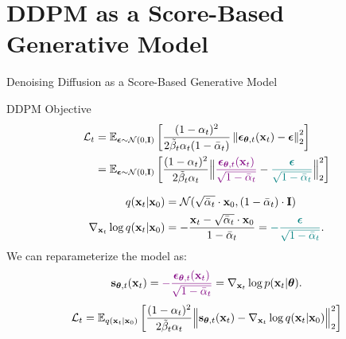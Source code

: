 \documentclass{beamer}
\begin{document}
\section{DDPM as a Score-Based Generative Model}
\begin{frame}{Denoising Diffusion as a Score-Based Generative Model}
	\begin{block}{DDPM Objective}
		\vspace{-0.7cm}
		\begin{align*}
			\mathcal{L}_t &= \mathbb{E}_{\boldsymbol{\epsilon} \sim \mathcal{N}(0, \mathbf{I})} \left[ \frac{(1 - \alpha_t)^2}{2\tilde{\beta}_t \alpha_t  (1 - \bar{\alpha}_t)}  \left\|  \boldsymbol{\epsilon}_{\boldsymbol{\theta}, t} (\mathbf{x}_t) - \boldsymbol{\epsilon}\right\|_2^2  \right] \\
			& = \mathbb{E}_{\boldsymbol{\epsilon} \sim \mathcal{N}(0, \mathbf{I})} \left[ \frac{(1 - \alpha_t)^2}{2\tilde{\beta}_t \alpha_t }  \Bigl\| {\color{violet} \frac{\boldsymbol{\epsilon}_{\boldsymbol{\theta}, t}  (\mathbf{x}_t) }{\sqrt{1 - \bar{\alpha}_t}}} - {\color{teal}\frac{\boldsymbol{\epsilon}}{\sqrt{1 - \bar{\alpha}_t}}}\Bigr\|_2^2  \right]
		\end{align*}
		\vspace{-0.7cm}
	\end{block}
	\vspace{-0.5cm}
	\begin{align*}
		q(\mathbf{x}_t | \mathbf{x}_0) &= \mathcal{N}(\sqrt{\bar{\alpha}_t} \cdot \mathbf{x}_0, (1 - \bar{\alpha}_t) \cdot \mathbf{I}) \\
		\nabla_{\mathbf{x}_t} \log q(\mathbf{x}_t | \mathbf{x}_0) &= - \frac{\mathbf{x}_t - \sqrt{\bar{\alpha}_t} \cdot \mathbf{x}_0}{1 - \bar{\alpha}_t} = {\color{teal}-  \frac{\boldsymbol{\epsilon}}{\sqrt{1 - \bar{\alpha}_t}}}.
	\end{align*}
	We can reparameterize the model as: 
		\vspace{-0.2cm}
		\[
			\mathbf{s}_{\boldsymbol{\theta}, t}(\mathbf{x}_t) = {\color{violet}- \frac{\boldsymbol{\epsilon}_{\boldsymbol{\theta}, t}(\mathbf{x}_t)}{\sqrt{1 - \bar{\alpha}_t}}} = \nabla_{\mathbf{x}_t} \log p(\mathbf{x}_t | \boldsymbol{\theta}).
		\]
		\[
			\mathcal{L}_t = \mathbb{E}_{q(\mathbf{x}_t | \mathbf{x}_0)} \left[ \frac{(1 - \alpha_t)^2}{2\tilde{\beta}_t \alpha_t}  \Bigl\|  \mathbf{s}_{\boldsymbol{\theta}, t} (\mathbf{x}_t) - \nabla_{\mathbf{x}_t} \log q(\mathbf{x}_t | \mathbf{x}_0) \Bigr\|_2^2  \right]
		\]
\end{frame}
\end{document}
